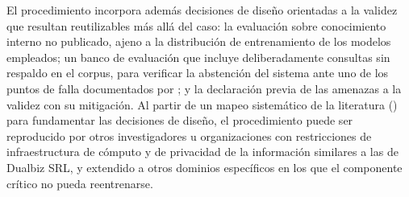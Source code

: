 El procedimiento incorpora además decisiones de diseño orientadas a la validez que resultan reutilizables más allá del caso: la evaluación sobre conocimiento interno no publicado, ajeno a la distribución de entrenamiento de los modelos empleados; un banco de evaluación que incluye deliberadamente consultas sin respaldo en el corpus, para verificar la abstención del sistema ante uno de los puntos de falla documentados por \textcite{Barnett2024_SevenFailurePoints}; y la declaración previa de las amenazas a la validez con su mitigación. Al partir de un mapeo sistemático de la literatura (\cite{Alcides2026}) para fundamentar las decisiones de diseño, el procedimiento puede ser reproducido por otros investigadores u organizaciones con restricciones de infraestructura de cómputo y de privacidad de la información similares a las de Dualbiz SRL, y extendido a otros dominios específicos en los que el componente crítico no pueda reentrenarse.

